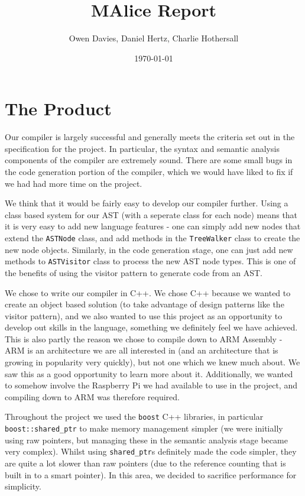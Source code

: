 \documentclass[11pt, notitlepage]{report}
\begin{document}
\title{MAlice Report}
\author{Owen Davies, Daniel Hertz, Charlie Hothersall}
\date{\today}

\maketitle

\section*{The Product}
Our compiler is largely successful and generally meets the criteria set out in the specification for the project. In particular, the syntax and semantic analysis components of the compiler are extremely sound. There are some small bugs in the code generation portion of the compiler, which we would have liked to fix if we had had more time on the project.

We think that it would be fairly easy to develop our compiler further. Using a class based system for our AST (with a seperate class for each node) means that it is very easy to add new language features - one can simply add new nodes that extend the \texttt{ASTNode} class, and add methods in the \texttt{TreeWalker} class to create the new node objects. Similarly, in the code generation stage, one can just add new methods to \texttt{ASTVisitor} class to process the new AST node types. This is one of the benefits of using the visitor pattern to generate code from an AST.

We chose to write our compiler in C++. We chose C++ because we wanted to create an object based solution (to take advantage of design patterns like the visitor pattern), and we also wanted to use this project as an opportunity to develop out skills in the language, something we definitely feel we have achieved. This is also partly the reason we chose to compile down to ARM Assembly - ARM is an architecture we are all interested in (and an architecture that is growing in popularity very quickly), but not one which we knew much about. We saw this as a good opportunity to learn more about it. Additionally, we wanted to somehow involve the Raspberry Pi we had available to use in the project, and compiling down to ARM was therefore required.

Throughout the project we used the \texttt{boost} C++ libraries, in particular \texttt{boost::shared\_ptr} to make memory management simpler (we were initially using raw pointers, but managing these in the semantic analysis stage became very complex). Whilst using \texttt{shared\_ptr}s definitely made the code simpler, they are quite a lot slower than raw pointers (due to the reference counting that is built in to a smart pointer). In this area, we decided to sacrifice performance for simplicity.
\end{document}
